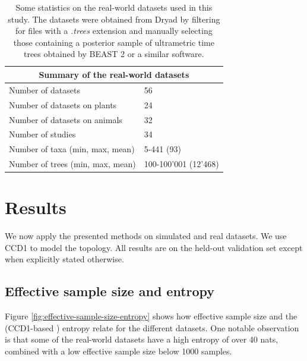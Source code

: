 \documentclass[10pt,letterpaper]{article}
\begin{document}
\begin{table}[H]
	\caption{Some statistics on the real-world datasets used in this study. The datasets were obtained from Dryad \cite{dryad} by filtering for files with a \emph{.trees} extension and manually selecting those containing a posterior sample of ultrametric time trees obtained by BEAST 2 or a similar software.}
	\label{table-bio-datasets}

	\centering
	\begin{tabular}{@{}ll@{}}
		\toprule
		\multicolumn{2}{c}{Summary of the real-world datasets} \\
		\midrule
		Number of datasets	& 56 \\
		Number of datasets on plants & 24 \\
		Number of datasets on animals & 32 \\
		Number of studies	& 34 \\
		Number of taxa (min, max, mean) & 5-441 (93) \\
		Number of trees (min, max, mean) & 100-100'001 (12'468) \\
		\bottomrule
	\end{tabular}
\end{table}

\section*{Results}

We now apply the presented methods on simulated and real datasets. We use CCD1 to model the topology. All results are on the held-out validation set except when explicitly stated otherwise.

\subsection*{Effective sample size and entropy}

Figure \ref{fig:effective-sample-size-entropy} shows how effective sample size and the (CCD1-based \cite{ccdentropy}) entropy relate for the different datasets. One notable observation is that some of the real-world datasets have a high entropy of over 40 nats, combined with a low effective sample size below 1000 samples.
\end{document}
